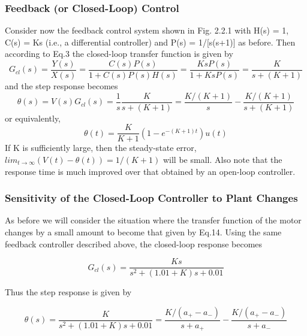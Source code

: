 \documentclass{article}
\begin{document}
{{{        }
            
        \subsubsection{Feedback (or Closed-Loop) Control}
        {
             Consider now the feedback control system shown in Fig. 2.2.1 with H(s) = 1, C(s) = Ks (i.e., a differential controller) and P(s) = 1/[s(s+1)] as before. Then according to Eq.3 the closed-loop transfer function is given by
            \begin{equation}
              G_{c l}(s)=\frac{Y(s)}{X(s)}=\frac{C(s) P(s)}{1+C(s) P(s) H(s)}=\frac{K s P(s)}{1+K s P(s)}=\frac{K}{s+(K+1)}
            \end{equation}
            and the step response becomes
            \begin{equation}
                \theta(s)=V(s) G_{c l}(s)=\frac{1}{s} \frac{K}{s+(K+1)}=\frac{K /(K+1)}{s}-\frac{K /(K+1)}{s+(K+1)}
            \end{equation}
            or equivalently,
            \begin{equation}
                \theta(t)=\frac{K}{K+1}\left(1-e^{-(K+1) t}\right) u(t)
            \end{equation}
            If K is sufficiently large, then the steady-state error, $lim_{t\rightarrow \infty}(V (t)-\theta (t)) = 1/(K + 1)$ will be small. Also note that the response time is much improved over that obtained by an open-loop controller.
        }

        \subsubsection{Sensitivity of the Closed-Loop Controller to Plant Changes}
       {
            As before we will consider the situation where the transfer function of the motor changes by a small amount to become that given by Eq.14. Using the same feedback controller described above, the closed-loop response becomes

            \begin{equation}
                G_{c l}(s)=\frac{K s}{s^{2}+(1.01+K) s+0.01}
            \end{equation}

            Thus the step response is given by

            \begin{equation}
                \theta(s)=\frac{K}{s^{2}+(1.01+K) s+0.01}=\frac{K /\left(a_{+}-a_{-}\right)}{s+a_{+}}-\frac{K /\left(a_{+}-a_{-}\right)}{s+a_{-}}
            \end{equation}

}}}
\end{document}
